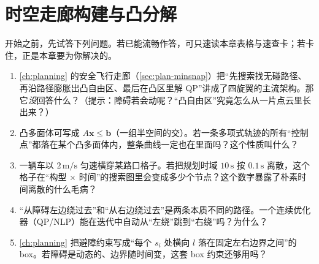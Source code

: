 \chapter{时空走廊构建与凸分解}
\label{ch:st-corridor}


\begin{practice}[前置自测]
开始之前，先试答下列问题。若已能流畅作答，可只速读本章表格与速查卡；若卡住，正是本章要为你解决的。
\begin{enumerate}
  \item \cref{ch:planning} 的安全飞行走廊（\cref{sec:plan-minsnap}）把“先搜索找无碰路径、再沿路径膨胀出凸自由区、最后在凸区里解 QP”讲成了四旋翼的主流架构。那它\emph{没}回答什么？（提示：障碍若会动呢？“凸自由区”究竟怎么从一片点云里长出来？）
  \item 凸多面体可写成 $A\mathbf{x}\le\mathbf{b}$（一组半空间的交）。若一条多项式轨迹的所有“控制点”都落在某个凸多面体内，整条曲线一定也在里面吗？这个性质叫什么？
  \item 一辆车以 $2\,\mathrm{m/s}$ 匀速横穿某路口格子。若把规划时域 $10\,\mathrm{s}$ 按 $0.1\,\mathrm{s}$ 离散，这个格子在“构型 $\times$ 时间”的搜索图里会变成多少个节点？这个数字暴露了朴素时间离散的什么毛病？
  \item “从障碍左边绕过去”和“从右边绕过去”是两条本质不同的路径。一个连续优化器（QP/NLP）能在迭代中自动从“左绕”跳到“右绕”吗？为什么？
  \item \cref{ch:planning} 把避障约束写成“每个 $s_i$ 处横向 $l$ 落在固定左右边界之间”的 box。若障碍是动态的、边界随时间变，这套 box 约束还够用吗？
\end{enumerate}
\end{practice}

